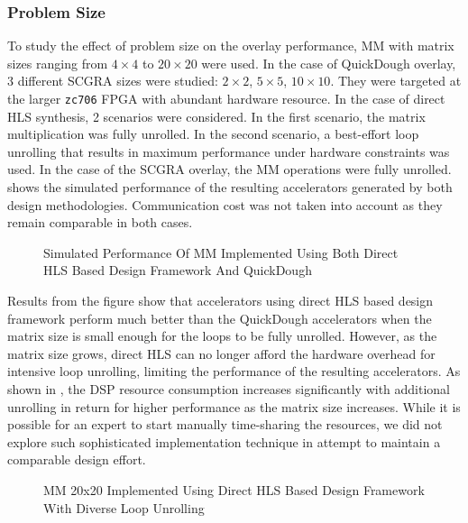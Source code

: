 \subsubsection{Problem Size}
To study the effect of problem size on the overlay performance, MM with
matrix sizes ranging from $4\times 4$ to $20 \times 20$ were used. In the case of QuickDough
overlay, \num{3} different SCGRA sizes were studied: $2\times 2$, $5\times 5$, $10\times 10$. They
were targeted at the larger \texttt{zc706} FPGA with abundant hardware resource. In the case of
direct HLS synthesis, \num{2} scenarios were considered.  In the first scenario, the matrix
multiplication was fully unrolled. In the second scenario, a best-effort loop unrolling that results in
maximum performance under hardware constraints was used. In the case of the SCGRA overlay, the
MM operations were fully unrolled.  shows the simulated
performance of the resulting accelerators generated by both design methodologies. Communication
cost was not taken into account as they remain comparable in both cases.

\begin{figure}
\centering
{}
\qquad
{}
\caption{Simulated Performance Of MM Implemented Using Both Direct HLS Based Design Framework And QuickDough}
\label{fig:mm-sim-perf}
\end{figure}

Results from the figure show that accelerators using direct HLS based design framework perform much
better than the QuickDough accelerators when the matrix size is small enough for the loops to be
fully unrolled. However, as the matrix size grows, direct HLS can no longer afford the hardware overhead for
intensive loop unrolling, limiting the performance of the resulting accelerators. As shown in
, the DSP resource consumption increases significantly with
additional unrolling in return for higher performance as the matrix size increases.  While it is
possible for an expert to start manually time-sharing the resources, we did not explore such
sophisticated implementation technique in attempt to maintain a comparable design effort.

\begin{figure}
\caption{MM 20x20 Implemented Using Direct HLS Based Design Framework With Diverse Loop Unrolling}
\label{fig:loop-unroll-and-pipeline}
\end{figure}

